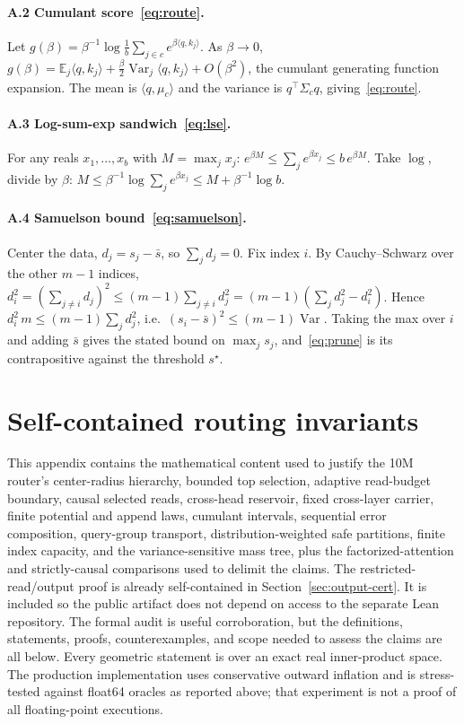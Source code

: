 \documentclass[11pt]{article}
\numberwithin{equation}{section}
\newcommand{\E}{\mathbb{E}}
\newcommand{\Var}{\operatorname{Var}}
\newcommand{\inner}[2]{\langle #1, #2\rangle}
\begin{document}
\paragraph{A.2 Cumulant score~\eqref{eq:route}.} Let $g(\beta)=\beta^{-1}\log\frac1b\sum_{j\in
c}e^{\beta\inner{q}{k_j}}$. As $\beta\to0$, $g(\beta)=\E_j\inner{q}{k_j}+\frac{\beta}{2}\Var_j\inner{q}{k_j}
+O(\beta^2)$, the cumulant generating function expansion. The mean is $\inner{q}{\mu_c}$ and the variance is
$q^\top\Sigma_c q$, giving~\eqref{eq:route}.

\paragraph{A.3 Log-sum-exp sandwich~\eqref{eq:lse}.} For any reals $x_1,\dots,x_b$ with $M=\max_j x_j$:
$e^{\beta M}\le\sum_j e^{\beta x_j}\le b\,e^{\beta M}$. Take $\log$, divide by $\beta$:
$M\le\beta^{-1}\log\sum_j e^{\beta x_j}\le M+\beta^{-1}\log b$.

\paragraph{A.4 Samuelson bound~\eqref{eq:samuelson}.} Center the data, $d_j=s_j-\bar s$, so $\sum_j d_j=0$. Fix
index $i$. By Cauchy--Schwarz over the other $m-1$ indices,
$d_i^2=(\sum_{j\neq i}d_j)^2\le(m-1)\sum_{j\neq i}d_j^2=(m-1)(\sum_j d_j^2-d_i^2)$. Hence $d_i^2\,m\le(m-1)\sum_j
d_j^2$, i.e.\ $(s_i-\bar s)^2\le(m-1)\Var$. Taking the max over $i$ and adding $\bar s$ gives the stated bound on
$\max_j s_j$, and~\eqref{eq:prune} is its contrapositive against the threshold $s^\star$.

\setcounter{proposition}{0}
\renewcommand{\theproposition}{B.\arabic{proposition}}
\renewcommand{\theHproposition}{B.\arabic{proposition}}
\section{Self-contained routing invariants}\label{app:invariants}

This appendix contains the mathematical content used to justify the 10M router's center-radius hierarchy,
bounded top selection, adaptive read-budget boundary, causal selected reads, cross-head reservoir, fixed
cross-layer carrier, finite potential and append laws, cumulant intervals, sequential error composition,
query-group transport, distribution-weighted safe partitions, finite index capacity, and the
variance-sensitive mass tree, plus the factorized-attention and strictly-causal comparisons used to delimit
the claims.
The restricted-read/output proof is already self-contained in Section~\ref{sec:output-cert}. It is included so
the public artifact does not depend on access to the separate Lean repository. The formal audit is useful
corroboration, but the definitions,
statements, proofs, counterexamples, and scope needed to assess the claims are all below. Every geometric
statement is over an exact real inner-product space. The production implementation uses conservative
outward inflation and is stress-tested against float64 oracles as reported above; that experiment is not a
proof of all floating-point executions.
\end{document}
